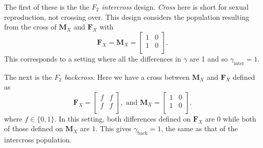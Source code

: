 \documentclass{article}
\newcommand{\m}[1]{\mathbf{#1}}               %
\begin{document}
The first of these is the the \textit{$F_2$ intercross} design. \emph{Cross} here is short for sexual reproduction, not crossing over. This design considers the population resulting from the cross of $\m{M}_X$ and $\m{F}_X$ with
$$\m{F}_X = \m{M}_X = \begin{bmatrix}
  1 & 0 \\
  1 & 0 \\
\end{bmatrix}.$$
This corresponds to a setting where all the differences in $\gamma$ are 1 and so $\gamma_{\text{inter}} = 1$.

The next is the \textit{$F_2$ backcross}. Here we have a cross between $\m{M}_X$ and $\m{F}_X$ defined as
$$\m{F}_X = \begin{bmatrix}
  f & f \\
  f & f \\
\end{bmatrix}, \text{ and }
\m{M}_X = \begin{bmatrix}
  1 & 0 \\
  1 & 0 \\
\end{bmatrix}.$$
where $f \in \{0,1\}$. In this setting, both differences defined on $\m{F}_X$ are 0 while both of those defined on $\m{M}_X$ are 1. This gives $\gamma_{\text{back}} = 1$, the same as that of the intercross population.
\end{document}
